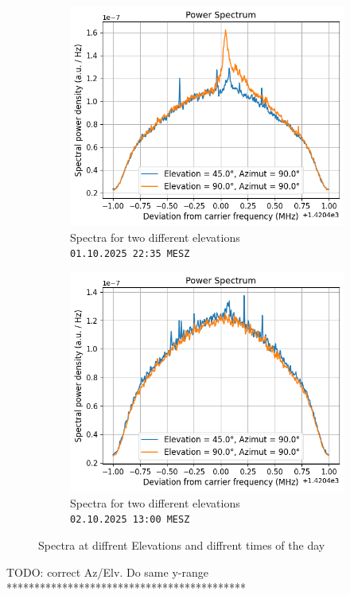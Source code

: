 \begin{figure}[h]
\centering
\begin{subfigure}[t]{0.49\textwidth}
    \centering
    \includegraphics[width=0.9\linewidth]{assets/elev_spectrum_night.png}
    \caption{Spectra for two different elevations\\ \texttt{01.10.2025 22:35 MESZ}}
\end{subfigure}
\begin{subfigure}[t]{0.49\textwidth}
    \centering
    \includegraphics[width=0.9\linewidth]{assets/elev_spectrum_day.png}
    \caption{Spectra for two different elevations\\ \texttt{02.10.2025 13:00 MESZ}}
\end{subfigure}
\caption{Spectra at diffrent Elevations and diffrent times of the day}
\label{fig:elev_spectra}
\end{figure}


TODO: correct Az/Elv. Do same y-range *******************************************